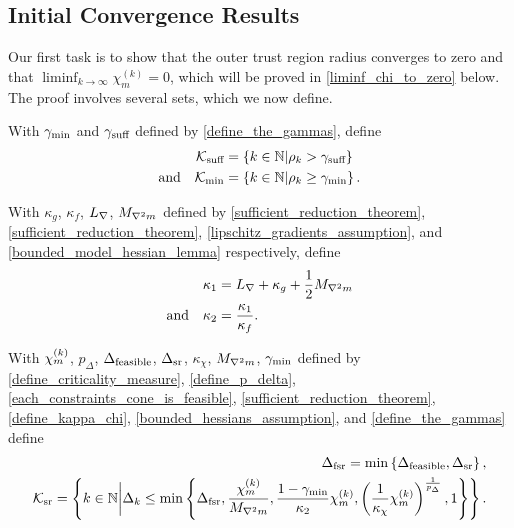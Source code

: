 \subsection{Initial Convergence Results}

\label{initial_convergence_results}

Our first task is to show that the outer trust region radius converges to zero and that $\liminf_{k \rightarrow\infty} \chi_m^{(k)} =0$, which will be proved in \cref{liminf_chi_to_zero} below.    The proof involves several sets, which we now define.  

With
$\gamma_{\textrm{min}}$ and $\gamma_{\textrm{suff}}$
defined by \cref{define_the_gammas},
define
\begin{align}
{\mathcal K_{\textrm{suff}}} &= \left\{k \in \mathbb N | \rho_k > \gamma_{\textrm{suff}} \right\} \label{define_suffiterates} \\
\textrm{and} \quad {\mathcal K_{\textrm{min}}} &= \left\{k \in \mathbb N | \rho_k \ge \gamma_{\textrm{min}} \right\} \label{define_miniterates}.
\end{align}

With
$\kappa_g$, $\kappa_f$, ${L_{\nabla}}$, ${M_{\nabla^2 m}}$
defined by
\cref{sufficient_reduction_theorem}, \cref{sufficient_reduction_theorem}, \cref{lipschitz_gradients_assumption}, and \cref{bounded_model_hessian_lemma}
respectively,  define
\begin{align}
{\kappa_1} &= {L_{\nabla}} + \kappa_{g} + \frac 1 2 {M_{\nabla^2 m}} \label{define_theircnot} \\
\textrm{and} \quad {\kappa_2} &= \frac{{\kappa_1}}{\kappa_f} .  \label{define_theirc}
\end{align}

With
${\chi_m^{(k)}}$, $p_{\Delta}$, ${\Delta_{\textrm{feasible}}}$, ${\Delta_{\textrm{sr}}}$, $\kappa_{\chi}$, ${M_{\nabla^2 m}}$, $\gamma_{\textrm{min}}$
defined by 
\cref{define_criticality_measure}, \cref{define_p_delta}, 
\cref{each_constraints_cone_is_feasible},
\cref{sufficient_reduction_theorem}, \cref{define_kappa_chi}, \cref{bounded_hessians_assumption}, and \cref{define_the_gammas}
define
\begin{align}
\Delta_{\textrm{fsr}} = \min\left\{{\Delta_{\textrm{feasible}}}, {\Delta_{\textrm{sr}}}\right\}, \label{define_dgood} \\
{\mathcal K_{\textrm{sr}}} = \left \{ k \in \mathbb N \bigg| \Delta_k \le \min \left\{ 
\Delta_{\textrm{fsr}},
\frac {{\chi_m^{(k)}}}{{M_{\nabla^2 m}}}, 
\frac{1-\gamma_{\textrm{min}}}{{\kappa_2}}{\chi_m^{(k)}},
\left(\frac 1 {\kappa_{\chi}}  {\chi_m^{(k)}}\right)^{\frac 1 {p_{\Delta}}}, 
1
\right\} \right \}. \label{define_reduceiterates}
\end{align}

